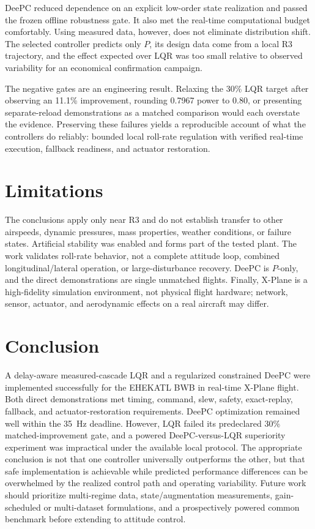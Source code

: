 \documentclass[conference]{IEEEtran}
\begin{document}
DeePC reduced dependence on an explicit low-order state realization and passed
the frozen offline robustness gate. It also met the real-time computational
budget comfortably. Using measured data, however, does not eliminate
distribution shift. The selected controller predicts only $P$, its design data
come from a local R3 trajectory, and the effect expected over LQR was too small
relative to observed variability for an economical confirmation campaign.

The negative gates are an engineering result. Relaxing the 30\% LQR target
after observing an 11.1\% improvement, rounding 0.7967 power to 0.80, or
presenting separate-reload demonstrations as a matched comparison would each
overstate the evidence. Preserving these failures yields a reproducible account
of what the controllers do reliably: bounded local roll-rate regulation with
verified real-time execution, fallback readiness, and actuator restoration.

\section{Limitations}
The conclusions apply only near R3 and do not establish transfer to other
airspeeds, dynamic pressures, mass properties, weather conditions, or failure
states. Artificial stability was enabled and forms part of the tested plant.
The work validates roll-rate behavior, not a complete attitude loop, combined
longitudinal/lateral operation, or large-disturbance recovery. DeePC is
$P$-only, and the direct demonstrations are single unmatched flights. Finally,
X-Plane is a high-fidelity simulation environment, not physical flight
hardware; network, sensor, actuator, and aerodynamic effects on a real aircraft
may differ.

\section{Conclusion}
A delay-aware measured-cascade LQR and a regularized constrained DeePC were
implemented successfully for the EHEKATL BWB in real-time X-Plane flight. Both
direct demonstrations met timing, command, slew, safety, exact-replay,
fallback, and actuator-restoration requirements. DeePC optimization remained
well within the \SI{35}{\hertz} deadline. However, LQR failed its predeclared 30\%
matched-improvement gate, and a powered DeePC-versus-LQR superiority experiment
was impractical under the available local protocol. The appropriate conclusion
is not that one controller universally outperforms the other, but that safe
implementation is achievable while predicted performance differences can be
overwhelmed by the realized control path and operating variability. Future work
should prioritize multi-regime data, state/augmentation measurements,
gain-scheduled or multi-dataset formulations, and a prospectively powered
common benchmark before extending to attitude control.
\end{document}
